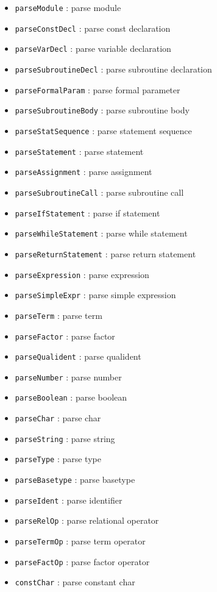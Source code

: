 \documentclass[12pt]{article}
\begin{document}
\begin{itemize}
    \item \texttt{parseModule} : parse module
    \item \texttt{parseConstDecl} : parse const declaration
    \item \texttt{parseVarDecl} : parse variable declaration
    \item \texttt{parseSubroutineDecl} : parse subroutine declaration
    \item \texttt{parseFormalParam} : parse formal parameter
    \item \texttt{parseSubroutineBody} : parse subroutine body
    \item \texttt{parseStatSequence} : parse statement sequence
    \item \texttt{parseStatement} : parse statement
    \item \texttt{parseAssignment} : parse assignment
    \item \texttt{parseSubroutineCall} : parse subroutine call
    \item \texttt{parseIfStatement} : parse if statement
    \item \texttt{parseWhileStatement} : parse while statement
    \item \texttt{parseReturnStatement} : parse return statement
    \item \texttt{parseExpression} : parse expression
    \item \texttt{parseSimpleExpr} : parse simple expression
    \item \texttt{parseTerm} : parse term
    \item \texttt{parseFactor} : parse factor
    \item \texttt{parseQualident} : parse qualident
    \item \texttt{parseNumber} : parse number
    \item \texttt{parseBoolean} : parse boolean
    \item \texttt{parseChar} : parse char
    \item \texttt{parseString} : parse string
    \item \texttt{parseType} : parse type
    \item \texttt{parseBasetype} : parse basetype
    \item \texttt{parseIdent} : parse identifier
    \item \texttt{parseRelOp} : parse relational operator
    \item \texttt{parseTermOp} : parse term operator
    \item \texttt{parseFactOp} : parse factor operator
    \item \texttt{constChar} : parse constant char
\end{itemize}
\end{document}
